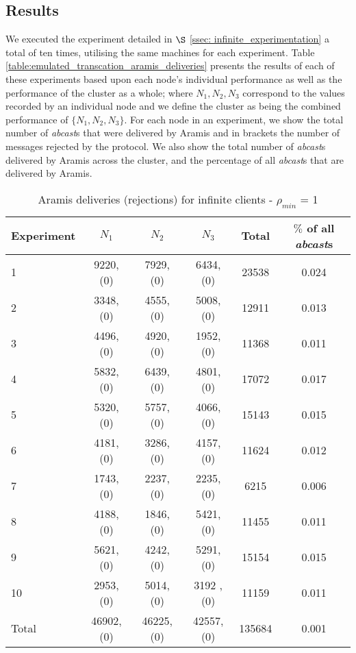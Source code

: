    \subsection{Results}
We executed the experiment detailed in $\S$ \ref{ssec: infinite_experimentation} a total of ten times, utilising the same machines for each experiment.  Table \ref{table:emulated_transcation_aramis_deliveries} presents the results of each of these experiments based upon each node's individual performance as well as the performance of the cluster as a whole; where $N_1, N_2, N_3$ correspond to the values recorded by an individual node and we define the cluster as being the combined performance of $\{N_1,N_2,N_3\}$.  For each node in an experiment, we show the total number of \emph{abcast}s that were delivered by \textsf{Aramis} and in brackets the number of messages rejected by the protocol.  We also show the total number of \emph{abcast}s delivered by \textsf{Aramis} across the cluster, and the percentage of all \emph{abcast}s that are delivered by \textsf{Aramis}.  
    
\begin{table}[p]
  \begin{center}
  \renewcommand{\arraystretch}{1.3}
   \begin{tabular}{|l|c|c|c|c|c|}
    \hline
    Experiment & $N_1$ & $N_2$       & $N_3$      & Total    & $\%$ of all \emph{abcast}s \\ \hline \hline
    1          & 9220, (0)  & 7929, (0)  & 6434, (0)  & 23538 & 0.024 \\ \hline
    2          & 3348, (0)  & 4555, (0)  & 5008, (0)  & 12911 & 0.013 \\ \hline
    3          & 4496, (0)  & 4920, (0)  & 1952, (0)  & 11368 & 0.011 \\ \hline
    4          & 5832, (0)  & 6439, (0)  & 4801, (0)  & 17072 & 0.017 \\ \hline
    5          & 5320, (0)  & 5757, (0)  & 4066, (0)  & 15143 & 0.015 \\ \hline
    6          & 4181, (0)  & 3286, (0)  & 4157, (0)  & 11624 & 0.012 \\ \hline
    7          & 1743, (0)  & 2237, (0)  & 2235, (0)  & 6215   & 0.006 \\ \hline
    8          & 4188, (0)  & 1846, (0)  & 5421, (0)  & 11455 & 0.011 \\ \hline
    9          & 5621, (0)  & 4242, (0)  & 5291, (0)  & 15154 & 0.015 \\ \hline
    10        & 2953, (0)  & 5014, (0)  & 3192 , (0) & 11159 & 0.011 \\ \hline \hline
    Total    &46902, (0) &46225, (0) &42557, (0) &135684 & 0.001\\ \hline
    \end{tabular}
    \caption{Aramis deliveries (rejections) for infinite clients - $\rho_{min}$ = 1}
    \label{table:infinite_clients_rejections}
  \end{center}
\end{table}
    
